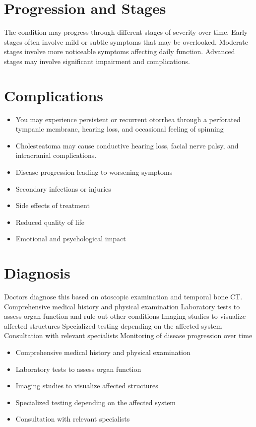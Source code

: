 \section{Progression and Stages}
The condition may progress through different stages of severity over time. Early stages often involve mild or subtle symptoms that may be overlooked. Moderate stages involve more noticeable symptoms affecting daily function. Advanced stages may involve significant impairment and complications.
\section{Complications}
\begin{itemize}[noitemsep]
  \item You may experience persistent or recurrent otorrhea through a perforated tympanic membrane, hearing loss, and occasional feeling of spinning
  \item Cholesteatoma may cause conductive hearing loss, facial nerve palsy, and intracranial complications.
  \item Disease progression leading to worsening symptoms
  \item Secondary infections or injuries
  \item Side effects of treatment
  \item Reduced quality of life
  \item Emotional and psychological impact
\end{itemize}
\section{Diagnosis}
Doctors diagnose this based on otoscopic examination and temporal bone CT. Comprehensive medical history and physical examination Laboratory tests to assess organ function and rule out other conditions Imaging studies to visualize affected structures Specialized testing depending on the affected system Consultation with relevant specialists Monitoring of disease progression over time

\begin{itemize}[noitemsep]
  \item Comprehensive medical history and physical examination
  \item Laboratory tests to assess organ function
  \item Imaging studies to visualize affected structures
  \item Specialized testing depending on the affected system
  \item Consultation with relevant specialists
\end{itemize}
